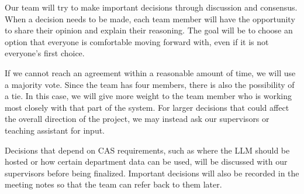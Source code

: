 \documentclass{article}
\begin{document}

Our team will try to make important decisions through discussion and consensus.
When a decision needs to be made, each team member will have the opportunity to
share their opinion and explain their reasoning. The goal will be to choose an
option that everyone is comfortable moving forward with, even if it is not
everyone's first choice.

\bigskip
If we cannot reach an agreement within a reasonable amount of time, we will use
a majority vote. Since the team has four members, there is also the possibility
of a tie. In this case, we will give more weight to the team member who is
working most closely with that part of the system. For larger decisions that
could affect the overall direction of the project, we may instead ask our
supervisors or teaching assistant for input.

\bigskip
Decisions that depend on CAS requirements, such as where the LLM should be
hosted or how certain department data can be used, will be discussed with our
supervisors before being finalized. Important decisions will also be recorded in
the meeting notes so that the team can refer back to them later.
\end{document}

